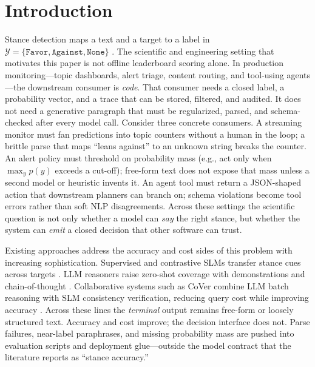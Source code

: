 \documentclass[10pt]{article}
\theoremstyle{definition}
\begin{document}
\section{Introduction}
\label{sec:intro}

Stance detection maps a text and a target to a label in
$\mathcal{Y}=\{\texttt{Favor},\texttt{Against},\texttt{None}\}$
\cite{mohammad2016semeval,allaway2020vast}.
The scientific and engineering setting that motivates this paper is not offline leaderboard scoring alone.
In production monitoring---topic dashboards, alert triage, content routing, and tool-using agents---the
downstream consumer is \emph{code}.
That consumer needs a closed label, a probability vector, and a trace that can be stored, filtered, and
audited.
It does not need a generative paragraph that must be regularized, parsed, and schema-checked after every
model call.
Consider three concrete consumers.
A streaming monitor must fan predictions into topic counters without a human in the loop; a brittle parse that
maps ``leans against'' to an unknown string breaks the counter.
An alert policy must threshold on probability mass (e.g., act only when $\max_y p(y)$ exceeds a cut-off); free-form
text does not expose that mass unless a second model or heuristic invents it.
An agent tool must return a JSON-shaped action that downstream planners can branch on; schema violations become
tool errors rather than soft NLP disagreements.
Across these settings the scientific question is not only whether a model can \emph{say} the right stance, but
whether the system can \emph{emit} a closed decision that other software can trust.

Existing approaches address the accuracy and cost sides of this problem with increasing sophistication.
Supervised and contrastive SLMs transfer stance cues across targets
\cite{liang2022jointcl,liu2019roberta}.
LLM reasoners raise zero-shot coverage with demonstrations and chain-of-thought
\cite{zhang2022chatgptstance,zhang2023cotstance,wei2022cot}.
Collaborative systems such as CoVer combine LLM batch reasoning with SLM consistency verification, reducing
query cost while improving accuracy \cite{yan2025cover}.
Across these lines the \emph{terminal} output remains free-form or loosely structured text.
Accuracy and cost improve; the decision interface does not.
Parse failures, near-label paraphrases, and missing probability mass are pushed into evaluation scripts and
deployment glue---outside the model contract that the literature reports as ``stance accuracy.''
\end{document}
